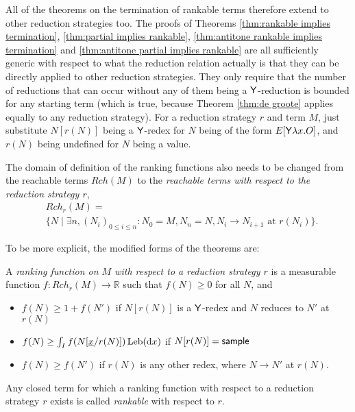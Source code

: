 All of the theorems on the termination of rankable terms therefore extend to other reduction strategies too. The proofs of Theorems \ref{thm:rankable implies termination}, \ref{thm:partial implies rankable}, \ref{thm:antitone rankable implies termination} and \ref{thm:antitone partial implies rankable} are all sufficiently generic with respect to what the reduction relation actually is that they can be directly applied to other reduction strategies. They only require that the number of reductions that can occur without any of them being a $\mathsf{Y}$-reduction is bounded for any starting term (which is true, because Theorem \ref{thm:de groote} applies equally to any reduction strategy). For a reduction strategy $r$ and term $M$, just substitute $N[r(N)]$ being a $\mathsf{Y}$-redex for $N$ being of the form $E[\mathsf{Y} \lambda x. O]$, and $r(N)$ being undefined for $N$ being a value.

The domain of definition of the ranking functions also needs to be changed from the reachable terms $Rch(M)$ to the \emph{reachable terms with respect to the reduction strategy $r$},
\begin{align*}
& Rch_r(M) = \\ & \{N \mid \exists n, (N_i)_{0 \leq i \leq n}: N_0 = M, N_n = N, N_i \to N_{i+1} \text{ at } r(N_i)\}.
\end{align*}

To be more explicit, the modified forms of the theorems are:
\begin{definition}\rm
A \emph{ranking function on $M$ with respect to a reduction strategy $r$} is a measurable function $f:\mathit{Rch}_r(M) \to \mathbb{R}$ such that $f(N) \geq 0$ for all $N$, and
\begin{itemize}
    \item $f(N) \geq 1+ f(N')$ if $N[r(N)]$ is a $\mathsf{Y}$-redex and $N$ reduces to $N'$ at $r(N)$
    \item $f(N) \geq \int_I f(N[\underline{x}/r(N)]) \, \mathrm{Leb}(\mathrm{d}x)$ if $N[r(N)] = \mathsf{sample}$

    \item $f(N) \geq f(N')$ if $r(N)$ is any other redex, where $N \to N'$ at $r(N)$.
\end{itemize}
Any closed term for which a ranking function with respect to a reduction strategy $r$ exists is called \emph{rankable} with respect to $r$. 
\end{definition}

